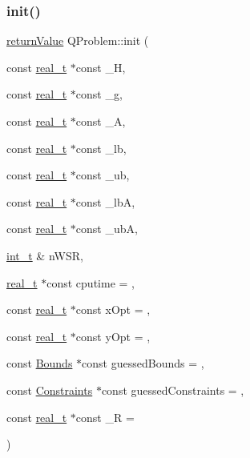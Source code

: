\subsubsection{\texorpdfstring{init()}{init()}\hspace{0.1cm}{\footnotesize\ttfamily [2/3]}}
{\footnotesize\ttfamily \hyperlink{_message_handling_8hpp_a81d556f613bfbabd0b1f9488c0fa865e}{return\+Value} Q\+Problem\+::init (\begin{DoxyParamCaption}\item[{const \hyperlink{qp_o_a_s_e_s__wrapper_8h_a0d00e2b3dfadee81331bbb39068570c4}{real\+\_\+t} $\ast$const}]{\+\_\+H,  }\item[{const \hyperlink{qp_o_a_s_e_s__wrapper_8h_a0d00e2b3dfadee81331bbb39068570c4}{real\+\_\+t} $\ast$const}]{\+\_\+g,  }\item[{const \hyperlink{qp_o_a_s_e_s__wrapper_8h_a0d00e2b3dfadee81331bbb39068570c4}{real\+\_\+t} $\ast$const}]{\+\_\+A,  }\item[{const \hyperlink{qp_o_a_s_e_s__wrapper_8h_a0d00e2b3dfadee81331bbb39068570c4}{real\+\_\+t} $\ast$const}]{\+\_\+lb,  }\item[{const \hyperlink{qp_o_a_s_e_s__wrapper_8h_a0d00e2b3dfadee81331bbb39068570c4}{real\+\_\+t} $\ast$const}]{\+\_\+ub,  }\item[{const \hyperlink{qp_o_a_s_e_s__wrapper_8h_a0d00e2b3dfadee81331bbb39068570c4}{real\+\_\+t} $\ast$const}]{\+\_\+lbA,  }\item[{const \hyperlink{qp_o_a_s_e_s__wrapper_8h_a0d00e2b3dfadee81331bbb39068570c4}{real\+\_\+t} $\ast$const}]{\+\_\+ubA,  }\item[{\hyperlink{_types_8hpp_ab6fd6105e64ed14a0c9281326f05e623}{int\+\_\+t} \&}]{n\+W\+SR,  }\item[{\hyperlink{qp_o_a_s_e_s__wrapper_8h_a0d00e2b3dfadee81331bbb39068570c4}{real\+\_\+t} $\ast$const}]{cputime = {},  }\item[{const \hyperlink{qp_o_a_s_e_s__wrapper_8h_a0d00e2b3dfadee81331bbb39068570c4}{real\+\_\+t} $\ast$const}]{x\+Opt = {},  }\item[{const \hyperlink{qp_o_a_s_e_s__wrapper_8h_a0d00e2b3dfadee81331bbb39068570c4}{real\+\_\+t} $\ast$const}]{y\+Opt = {},  }\item[{const \hyperlink{class_bounds}{Bounds} $\ast$const}]{guessed\+Bounds = {},  }\item[{const \hyperlink{class_constraints}{Constraints} $\ast$const}]{guessed\+Constraints = {},  }\item[{const \hyperlink{qp_o_a_s_e_s__wrapper_8h_a0d00e2b3dfadee81331bbb39068570c4}{real\+\_\+t} $\ast$const}]{\+\_\+R = {} }\end{DoxyParamCaption})}

